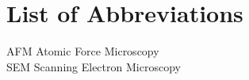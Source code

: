 \chapter*{List of Abbreviations}

\noindent

AFM \hfill Atomic Force Microscopy \\

SEM \hfill Scanning Electron Microscopy \\

\newpage